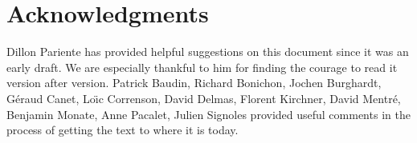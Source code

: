 \documentclass[web]{frama-c-book}
\begin{document}



\section*{Acknowledgments}

Dillon Pariente has provided helpful suggestions on this document
since it was an early draft. We are especially thankful to him for
finding the courage to read it version after version.
Patrick Baudin, Richard Bonichon, 
Jochen Burghardt,
G\'eraud Canet, Lo\"\i c Correnson,
David Delmas, Florent Kirchner, David Mentr\'e, Benjamin Monate, Anne Pacalet, 
Julien Signoles provided useful comments in the process of
getting the text to where it is today.

\end{document}
